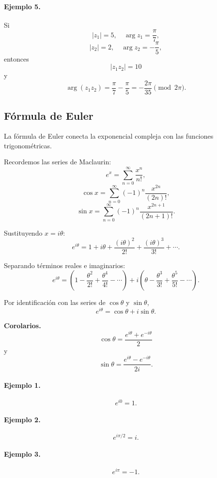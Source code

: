 \paragraph{Ejemplo 5.}
Si
\[
|z_1|=5,\quad \arg z_1=\frac{\pi}{7},
\]
\[
|z_2|=2,\quad \arg z_2=-\frac{\pi}{5},
\]
entonces
\[
|z_1z_2|=10
\]
y
\[
\arg(z_1z_2)
=
\frac{\pi}{7}-\frac{\pi}{5}
=
-\frac{2\pi}{35}
\pmod{2\pi}.
\]

\subsection{Fórmula de Euler}

La fórmula de Euler conecta la exponencial compleja con las funciones
trigonométricas.

Recordemos las series de Maclaurin:
\[
e^x
=
\sum_{n=0}^{\infty}\frac{x^n}{n!},
\]
\[
\cos x
=
\sum_{n=0}^{\infty}
(-1)^n\frac{x^{2n}}{(2n)!},
\]
\[
\sin x
=
\sum_{n=0}^{\infty}
(-1)^n\frac{x^{2n+1}}{(2n+1)!}.
\]

Sustituyendo $x=i\theta$:
\[
e^{i\theta}
=
1+i\theta+\frac{(i\theta)^2}{2!}
+\frac{(i\theta)^3}{3!}+\cdots.
\]

Separando términos reales e imaginarios:
\[
e^{i\theta}
=
\left(
1-\frac{\theta^2}{2!}
+\frac{\theta^4}{4!}
-\cdots
\right)
+
i
\left(
\theta-\frac{\theta^3}{3!}
+\frac{\theta^5}{5!}
-\cdots
\right).
\]

Por identificación con las series de $\cos\theta$ y $\sin\theta$,
\[
\boxed{
e^{i\theta}
=
\cos\theta+i\sin\theta.
}
\]

\textbf{Corolarios.}
\[
\boxed{
\cos\theta
=
\frac{e^{i\theta}+e^{-i\theta}}{2}
}
\]
y
\[
\boxed{
\sin\theta
=
\frac{e^{i\theta}-e^{-i\theta}}{2i}.
}
\]

\paragraph{Ejemplo 1.}
\[
e^{i0}=1.
\]

\paragraph{Ejemplo 2.}
\[
e^{i\pi/2}=i.
\]

\paragraph{Ejemplo 3.}
\[
e^{i\pi}=-1.
\]


